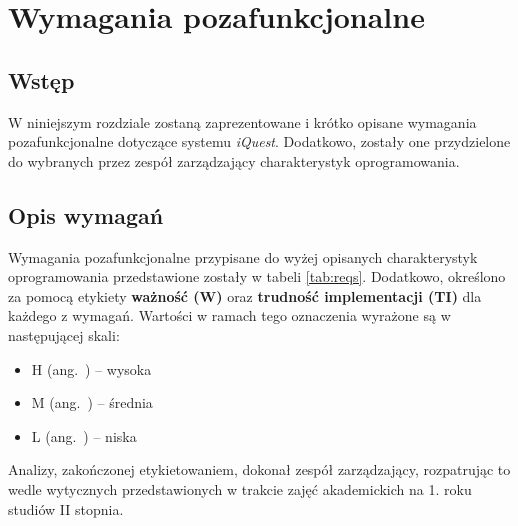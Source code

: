 \chapter{Wymagania pozafunkcjonalne}
\label{Chapter4}

\section{Wstęp}
\label{Chapter41}

W niniejszym rozdziale zostaną zaprezentowane i krótko opisane wymagania pozafunkcjonalne dotyczące systemu \textit{iQuest}. Dodatkowo, zostały one przydzielone do wybranych przez zespół zarządzający charakterystyk oprogramowania.

\section{Opis wymagań}
\label{Chapter43}

Wymagania pozafunkcjonalne przypisane do wyżej opisanych charakterystyk oprogramowania przedstawione zostały w tabeli \ref{tab:reqs}. Dodatkowo, określono za pomocą etykiety \textbf{ważność (W)} oraz \textbf{trudność implementacji (TI)} dla każdego z wymagań. Wartości w ramach tego oznaczenia wyrażone są w następującej skali:

\begin{itemize}
\item{H (ang.~) -- wysoka}
\item{M (ang.~) -- średnia}
\item{L (ang.~) -- niska}
\end{itemize}

Analizy, zakończonej etykietowaniem, dokonał zespół zarządzający, rozpatrując to wedle wytycznych przedstawionych w trakcie zajęć akademickich na 1. roku studiów II stopnia.

